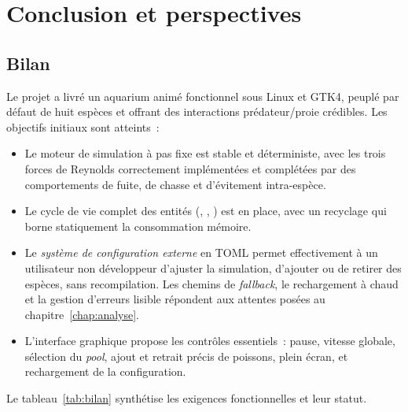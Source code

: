 \chapter{Conclusion et perspectives}
\label{chap:conclusion}

\section{Bilan}

Le projet a livré un aquarium animé fonctionnel sous Linux et
GTK4, peuplé par défaut de huit espèces et offrant des
interactions prédateur/proie crédibles. Les objectifs initiaux
sont atteints~:

\begin{itemize}
  \item Le moteur de simulation à pas fixe est stable et
    déterministe, avec les trois forces de Reynolds
    correctement implémentées et complétées par des
    comportements de fuite, de chasse et d'évitement
    intra-espèce.

  \item Le cycle de vie complet des entités (,
    , ) est en place, avec un
    recyclage qui borne statiquement la consommation mémoire.

  \item Le \emph{système de configuration externe} en TOML
    permet effectivement à un utilisateur non développeur
    d'ajuster la simulation, d'ajouter ou de retirer des
    espèces, sans recompilation. Les chemins de
    \emph{fallback}, le rechargement à chaud et la gestion
    d'erreurs lisible répondent aux attentes posées au
    chapitre~\ref{chap:analyse}.

  \item L'interface graphique propose les contrôles essentiels~:
    pause, vitesse globale, sélection du \emph{pool}, ajout et
    retrait précis de poissons, plein écran, et rechargement de
    la configuration.
\end{itemize}

Le tableau~\ref{tab:bilan} synthétise les exigences
fonctionnelles et leur statut.

